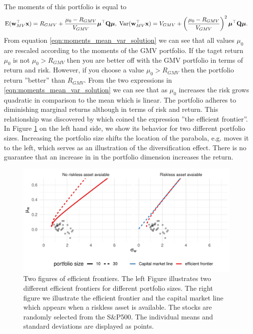\documentclass[oneside]{book}\usepackage{knitr}
\begin{document}
The moments of this portfolio is equal to
\begin{equation}\label{eqn:moments_mean_var_solution}
\operatorname{E}(\mathbf{w}_{MV}^\top\mathbf{x}) = R_{GMV} + \frac{\mu_0 - R_{GMV}}{V_{GMV}} \mbox{\boldmath$\mu$}^\top \mathbf{Q} \mbox{\boldmath$\mu$}, \;
\operatorname{Var}(\mathbf{w}_{MV}^\top\mathbf{x}) =V_{GMV} + \left(\frac{\mu_0 - R_{GMV}}{V_{GMV}}\right)^2 \mbox{\boldmath$\mu$}^\top \mathbf{Q} \mbox{\boldmath$\mu$}.
\end{equation}
From equation \eqref{eqn:moments_mean_var_solution} we can see that all values $\mu_0$ are rescaled according to the moments of the GMV portfolio. 
If the taget return $\mu_0$ is not $\mu_0>R_{GMV}$ then you are better off with the GMV portfolio in terms of return and risk.
However, if you choose a value $\mu_0>R_{GMV}$ then the portfolio return ''better'' than $R_{GMV}$. From the two expressions in \eqref{eqn:moments_mean_var_solution} we can see that as $\mu_0$ increases the risk grows quadratic in comparison to the mean which is linear. The portfolio adheres to diminishing marginal returns although in terms of risk and return. This relationship was discovered by \textcite{merton1972} which coined the expression ''the efficient frontier''. In Figure \ref{fig:mertons_efficient_frontier} on the left hand side, we show its behavior for two different portfolio sizes. Increasing the portfolio size shifts the location of the parabola, e.g. moves it to the left, which serves as an illustration of the diversification effect. There is no guarantee that an increase in in the portfolio dimension increases the return.
\begin{knitrout}\small
{}\color{fgcolor}\begin{figure}

{\centering \includegraphics[width=\maxwidth]{figure/mertons_efficient_frontier-1} 

}

\caption[Two figures of efficient frontiers]{Two figures of efficient frontiers. The left Figure illustrates two different efficient frontiers for different portfolio sizes. The right figure we illustrate the efficient frontier and the capital market line which appears when a riskless asset is available. The stocks are randomly selected from the S\&P500. The individual means and standard deviations are displayed as points.}\label{fig:mertons_efficient_frontier}
\end{figure}

\end{knitrout}
\end{document}
